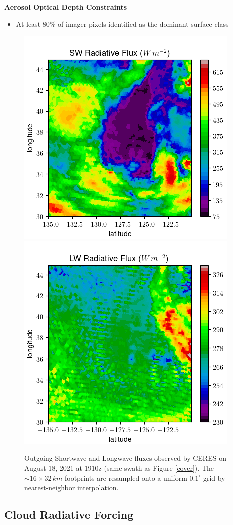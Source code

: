 \documentclass[12pt]{article}
\begin{document}
    \textbf{Aerosol Optical Depth Constraints}
    \begin{itemize}[itemsep=0pt, parsep=0pt, before=\setlength{\baselineskip}{6mm}]
        \item At least $80\%$ of imager pixels identified as the dominant surface class
    \end{itemize}

    \begin{figure}[h!]\label{flux-interp}
        \centering
        \begin{center}
            \includegraphics[width=.48\linewidth]{figs/interp_swflux.png}
            \includegraphics[width=.48\linewidth]{figs/interp_lwflux.png}
        \end{center}
        \caption{Outgoing Shortwave and Longwave fluxes observed by CERES on August 18, 2021 at 1910z (same swath as Figure \ref{cover}). The $\sim16\times32\,\si{km}$ footprints are resampled onto a uniform $0.1^\circ$ grid by nearest-neighbor interpolation.}
    \end{figure}

    \subsection{Cloud Radiative Forcing}
\end{document}
